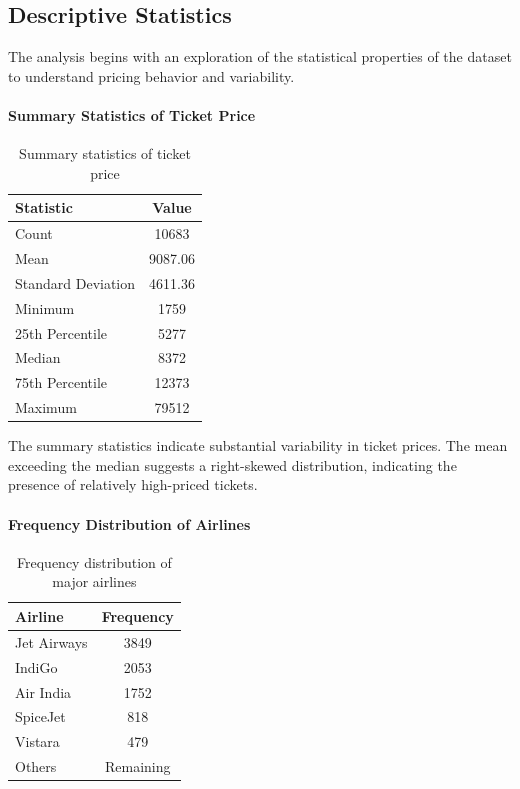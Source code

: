 \documentclass[12pt]{article}
\begin{document}
\subsection{Descriptive Statistics}

The analysis begins with an exploration of the statistical properties of the dataset to understand pricing behavior and variability.

\paragraph{Summary Statistics of Ticket Price}

\begin{table}[h!]
\centering
\begin{tabular}{l c}
\hline
Statistic & Value \\
\hline
Count & 10683 \\
Mean & 9087.06 \\
Standard Deviation & 4611.36 \\
Minimum & 1759 \\
25th Percentile & 5277 \\
Median & 8372 \\
75th Percentile & 12373 \\
Maximum & 79512 \\
\hline
\end{tabular}
\caption{Summary statistics of ticket price}
\end{table}

The summary statistics indicate substantial variability in ticket prices. The mean exceeding the median suggests a right-skewed distribution, indicating the presence of relatively high-priced tickets.

\paragraph{Frequency Distribution of Airlines}

\begin{table}[h!]
\centering
\begin{tabular}{l c}
\hline
Airline & Frequency \\
\hline
Jet Airways & 3849 \\
IndiGo & 2053 \\
Air India & 1752 \\
SpiceJet & 818 \\
Vistara & 479 \\
Others & Remaining \\
\hline
\end{tabular}
\caption{Frequency distribution of major airlines}
\end{table}
\end{document}
